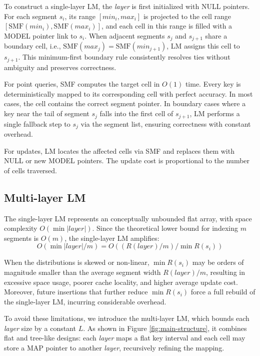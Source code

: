 To construct a single-layer LM, the \textit{layer} is first initialized with NULL pointers. For each segment $s_i$, its range $[min_i,max_i]$ is projected to the cell range $[\text{SMF}(min_i), \text{SMF}(max_i)]$, and each cell in this range is filled with a MODEL pointer link to $s_i$. When adjacent segments $s_j$ and $s_{j+1}$ share a boundary cell, i.e., $\text{SMF}(max_j) = \text{SMF}(min_{j+1})$, LM assigns this cell to $s_{j+1}$. This minimum-first boundary rule consistently resolves ties without ambiguity and preserves correctness.

For point queries, SMF computes the target cell in $O(1)$ time. Every key is deterministically mapped to its corresponding cell with perfect accuracy. In most cases, the cell contains the correct segment pointer. In boundary cases where a key near the tail of segment $s_j$ falls into the first cell of $s_{j+1}$, LM performs a single fallback step to $s_j$ via the segment list, ensuring correctness with constant overhead.

For updates, LM locates the affected cells via SMF and replaces them with NULL or new MODEL pointers. The update cost is proportional to the number of cells traversed.

\subsection{Multi-layer LM}
\label{sec:ml-lm}
The single-layer LM represents an conceptually unbounded flat array, with space complexity $O(\min |layer|)$. Since the theoretical lower bound for indexing $m$ segments is $O(m)$, the single-layer LM amplifies:
$$
O(\min |layer|/m) = O\left( (R(layer)/m) / \min R(s_i) \right)
$$

When the distributions is skewed or non-linear, $\min R(s_i)$ may be orders of magnitude smaller than the average segment width $R(layer)/m$, resulting in excessive space usage, poorer cache locality, and higher average update cost. Moreover, future insertions that further reduce $\min R(s_i)$ force a full rebuild of the single-layer LM, incurring considerable overhead.

To avoid these limitations, we introduce the multi-layer LM, which bounds each \textit{layer} size by a constant $\mathit{L}$. As shown in Figure \ref{fig:main-structure}, it combines flat and tree-like designs: each \textit{layer} maps a flat key interval and each cell may store a MAP pointer to another \textit{layer}, recursively refining the mapping.

